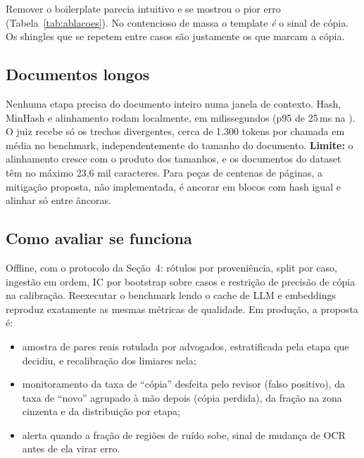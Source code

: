 \documentclass[11pt,a4paper]{article}
\newcommand{\cfg}[1]{\texttt{\detokenize{#1}}}
\begin{document}
Remover o boilerplate parecia intuitivo e se mostrou o pior erro (Tabela~\ref{tab:ablacoes}). No
contencioso de massa o template \emph{é} o sinal de cópia. Os shingles que se repetem entre casos
são justamente os que marcam a cópia.

\subsection{Documentos longos}\label{sec:q1-longos}
Nenhuma etapa precisa do documento inteiro numa janela de contexto. Hash, MinHash e alinhamento
rodam localmente, em milissegundos (p95 de 25\,ms na \cfg{cascata}). O juiz recebe só os trechos
divergentes, cerca de 1.300 tokens por chamada em média no benchmark, independentemente do tamanho
do documento. \textbf{Limite:} o alinhamento cresce com o produto dos tamanhos, e os documentos do
dataset têm no máximo 23,6 mil caracteres. Para peças de centenas de páginas, a mitigação proposta,
não implementada, é ancorar em blocos com hash igual e alinhar só entre âncoras.

\subsection{Como avaliar se funciona}\label{sec:q1-aval}
Offline, com o protocolo da Seção~4: rótulos por proveniência, split por caso, ingestão em ordem,
IC por bootstrap sobre casos e restrição de precisão de cópia na calibração. Reexecutar o benchmark
lendo o cache de LLM e embeddings reproduz exatamente as mesmas métricas de qualidade. Em produção,
a proposta é:
\begin{itemize}
  \item amostra de pares reais rotulada por advogados, estratificada pela etapa que decidiu, e
    recalibração dos limiares nela;
  \item monitoramento da taxa de ``cópia'' desfeita pelo revisor (falso positivo), da taxa de
    ``novo'' agrupado à mão depois (cópia perdida), da fração na zona cinzenta e da distribuição
    por etapa;
  \item alerta quando a fração de regiões de ruído sobe, sinal de mudança de OCR antes de ela
    virar erro.
\end{itemize}
\end{document}
